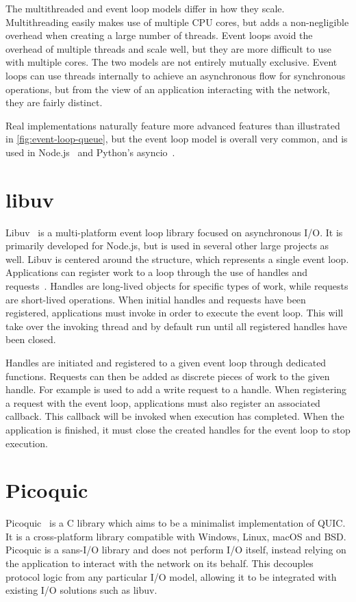 The multithreaded and event loop models differ in how they scale.
Multithreading easily makes use of
multiple CPU cores, but adds a non-negligible overhead when
creating a large number of threads.
Event loops avoid the overhead of multiple threads and scale well, but they are more difficult to use with
multiple cores. The two models are not entirely mutually exclusive.
Event loops can use threads internally to achieve an asynchronous flow
for synchronous operations, but from the view of an application
interacting with the network, they are fairly distinct.

Real implementations naturally feature more advanced features than
illustrated in \cref{fig:event-loop-queue}, but the event loop model is overall very common,
and is used in Node.js~\cite{nodejsEventLoop} and Python's asyncio~\cite{pythonAsyncio}.

\section{libuv}
Libuv~\cite{Libuv2025} is a multi-platform event loop library focused on asynchronous I/O.
It is primarily developed for Node.js, but is used in several other large projects as well.
Libuv is centered around the  structure, which represents a single event loop.
Applications can register work to a loop through the use of handles and requests~\cite{libuv_design}.
Handles are long-lived objects for specific types of work, while requests are short-lived operations.
When initial handles and requests have been registered, applications must invoke 
in order to execute the event loop. This
will take over the invoking thread and by default run until all registered handles
have been closed.

Handles are initiated and registered to a given event loop through
dedicated functions. Requests can then be added as discrete
pieces of work to the given handle. For example  is
used to add a write request to a  handle. When registering
a request with the event loop, applications must also register an
associated callback. This callback will be invoked when
execution has completed. When the application is finished, it must close the created handles for
the event loop to stop execution.

\section{Picoquic}\label{sec:picoquic}
Picoquic~\cite{christianhuitemaPicoquic} is a C library which aims to be a
minimalist implementation of QUIC. It is a cross-platform
library compatible with Windows, Linux, macOS and BSD.
Picoquic is a sans-I/O \cite{cannon2016sansio} library
and does not perform I/O itself, instead relying on the
application to interact with the network on its behalf.
This decouples protocol logic from any
particular I/O model, allowing it to be integrated with existing
I/O solutions such as libuv.

